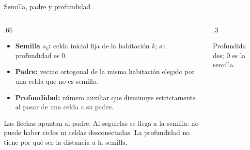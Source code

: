 \documentclass[aspectratio=169,11pt]{beamer}
\newcommand{\examplegrid}{%
  \draw[step=1,ink!35] (0,0) grid (4,4);
  \draw[ink,thick] (0,0) rectangle (4,4);
}
\begin{document}
\begin{frame}{Semilla, padre y profundidad}
  \begin{columns}[T,onlytextwidth]
  \begin{column}{.66\textwidth}
  \small
  \begin{itemize}
    \setlength{\itemsep}{3mm}
    \item \textbf{Semilla \(s_k\):} celda inicial fija de la habitaci\'on
      \(k\); su profundidad es \(0\).
    \item \textbf{Padre:} vecino ortogonal de la misma habitaci\'on
      elegido por una celda que no es semilla.
    \item \textbf{Profundidad:} n\'umero auxiliar que disminuye
      estrictamente al pasar de una celda a su padre.
  \end{itemize}
  \small Las flechas apuntan al padre. Al seguirlas se llega a la semilla:
  no puede haber ciclos ni celdas desconectadas. La profundidad
  no tiene por qu\'e ser la distancia a la semilla.
  \end{column}
  \begin{column}{.3\textwidth}
    \centering
    \par\smallskip\scriptsize Profundidades; \(0\) es la semilla.
  \end{column}
  \end{columns}
\end{frame}
\end{document}
